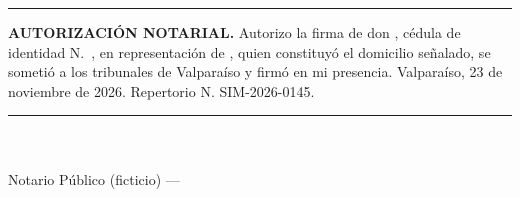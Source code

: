 \documentclass[11pt]{article}
\begin{document}
\vspace{8pt}
\noindent\rule{\linewidth}{0.4pt}\par\smallskip
\noindent\begin{minipage}[t]{0.68\linewidth}\small
  \textbf{AUTORIZACIÓN NOTARIAL.} Autorizo la firma de don \textbf{\LFXrepresentante}, cédula de identidad N.\textdegree~\SIMrunrepresentante, en representación de \LFXempresa, quien constituyó el domicilio señalado, se sometió a los tribunales de Valparaíso y firmó en mi presencia. Valparaíso, 23 de noviembre de 2026. Repertorio N.\textdegree{} SIM-2026-0145.

  \vspace{14pt}
  \rule{6cm}{0.4pt}\\
  \SIMnotarioTitular\\ Notario Público (ficticio) --- \SIMnotaria\\ \SIMnotariaDir
\end{minipage}\hfill
\begin{minipage}[t]{2.8cm}\raggedleft{}\end{minipage}
\end{document}
